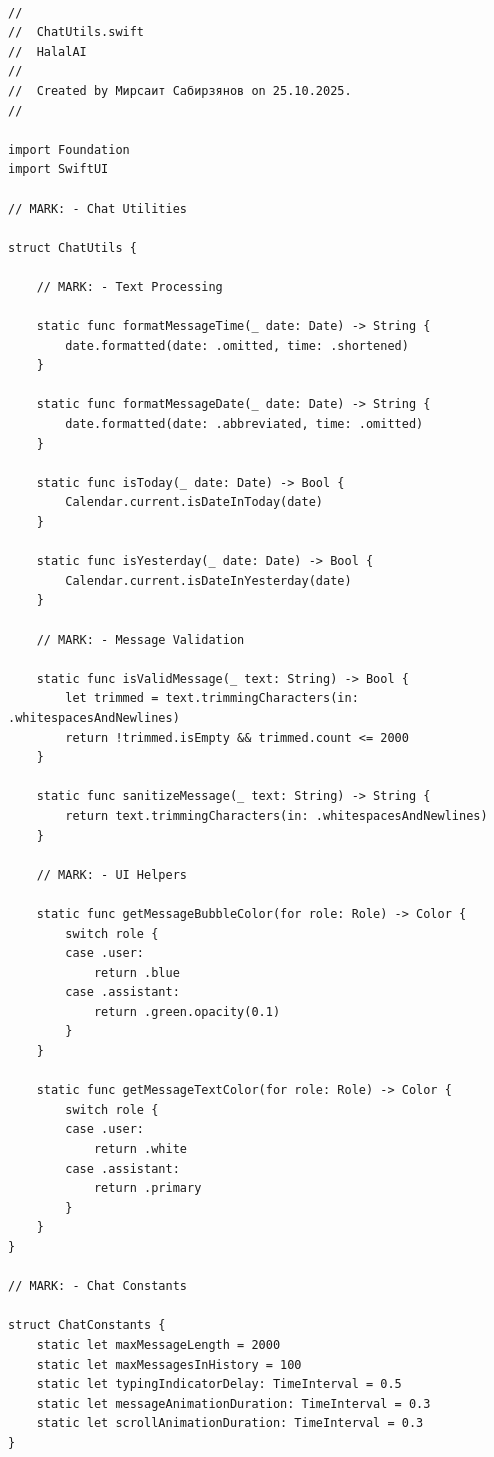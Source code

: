\begin{lstlisting}[basicstyle=\tiny\ttfamily,breaklines=true]

//
//  ChatUtils.swift
//  HalalAI
//
//  Created by Мирсаит Сабирзянов on 25.10.2025.
//

import Foundation
import SwiftUI

// MARK: - Chat Utilities

struct ChatUtils {
    
    // MARK: - Text Processing
    
    static func formatMessageTime(_ date: Date) -> String {
        date.formatted(date: .omitted, time: .shortened)
    }
    
    static func formatMessageDate(_ date: Date) -> String {
        date.formatted(date: .abbreviated, time: .omitted)
    }
    
    static func isToday(_ date: Date) -> Bool {
        Calendar.current.isDateInToday(date)
    }
    
    static func isYesterday(_ date: Date) -> Bool {
        Calendar.current.isDateInYesterday(date)
    }
    
    // MARK: - Message Validation
    
    static func isValidMessage(_ text: String) -> Bool {
        let trimmed = text.trimmingCharacters(in: .whitespacesAndNewlines)
        return !trimmed.isEmpty && trimmed.count <= 2000
    }
    
    static func sanitizeMessage(_ text: String) -> String {
        return text.trimmingCharacters(in: .whitespacesAndNewlines)
    }
    
    // MARK: - UI Helpers
    
    static func getMessageBubbleColor(for role: Role) -> Color {
        switch role {
        case .user:
            return .blue
        case .assistant:
            return .green.opacity(0.1)
        }
    }
    
    static func getMessageTextColor(for role: Role) -> Color {
        switch role {
        case .user:
            return .white
        case .assistant:
            return .primary
        }
    }
}

// MARK: - Chat Constants

struct ChatConstants {
    static let maxMessageLength = 2000
    static let maxMessagesInHistory = 100
    static let typingIndicatorDelay: TimeInterval = 0.5
    static let messageAnimationDuration: TimeInterval = 0.3
    static let scrollAnimationDuration: TimeInterval = 0.3
}


\end{lstlisting}
